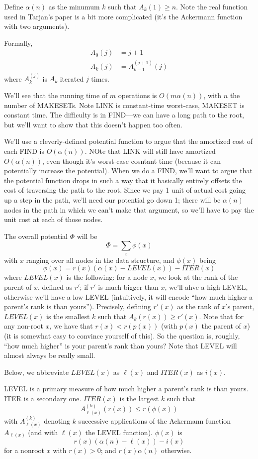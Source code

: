 \documentclass{article}
\begin{document}
Define $\alpha(n)$ as the minumum $k$ such that $A_k(1) \geq n$.
Note the real function used in Tarjan's paper is a bit more complicated (it's
the Ackermann function with two arguments).

Formally,
\begin{align}
A_0(j) &=
j + 1 \\
A_k(j) &=
A_{k-1}^{(j+1)}(j)
\end{align}
where $A_k^{(j)}$ is $A_k$ iterated $j$ times.

We'll see that the running time of $m$ operations is $O(m\alpha(n))$, with 
$n$ the number of MAKESETs.
Note LINK is constant-time worst-case, MAKESET is constant time.
The difficulty is in FIND---we can have a long path to the root, but we'll
want to show that this doesn't happen too often.

We'll use a cleverly-defined potential function to argue that the amortized
cost of each FIND is $O(\alpha(n))$.
NOte that LINK will still have amortized $O(\alpha(n))$, even though it's
worst-case cosntant time (because it can potentially increase the potential).
When we do a FIND, we'll want to argue that the potential function drops
in such a way that it basically entirely offsets the cost of traversing
the path to the root.
Since we pay 1 unit of actual cost going up a step in the path, we'll need
our potential go down 1; there will be $\alpha(n)$ nodes in the path in which
we can't make that argument, so we'll have to pay the unit cost at each of
those nodes.

The overall potential $\Phi$ will be
$$
\Phi = \sum_x \phi(x)
$$
with $x$ ranging over all nodes in the data structure, and $\phi(x)$ being
$$
\phi(x) = r(x) (\alpha(x) - LEVEL(x)) - ITER(x)
$$
where $LEVEL(x)$ is the following: for a node $x$, we look at the
rank of the parent of $x$, defined as $r'$; if $r'$ is much bigger than
$x$, we'll ahve a high LEVEL, otherwise we'll have a low LEVEL (intuitively,
it will encode ``how much higher a parent's rank is than yours'').
Precisely, defining $r'(x)$ as the rank of $x$'s parent,
$LEVEL(x)$ is the smallest $k$ such that $A_k(r(x)) \geq r'(x)$.
Note that for any non-root $x$, we have that $r(x) < r(p(x))$ (with $p(x)$ the
parent of $x$) (it is somewhat easy to convince yourself of this).
So the question is, roughly, ``how much higher'' is your parent's rank than
yours?
Note that LEVEL will almost always be really small.

Below, we abbreviate $LEVEL(x)$ as $\ell(x)$ and $ITER(x)$ as $i(x)$.

LEVEL is a primary measure of how much higher a parent's rank is than yours.
ITER is a secondary one.
$ITER(x)$ is the largest $k$ such that 
$$A_{\ell(x)}^{(k)}(r(x)) \leq r(\phi(x))$$
with $A_{\ell(x)}^{(k)}$ denoting $k$ successive applications of the
Ackermann function $A_{\ell(x)}$ (and with $\ell(x)$ the LEVEL function).
$\phi(x)$ is 
$$r(x) (\alpha(n) - \ell(x)) - i(x)$$ 
for a nonroot
$x$ with $r(x) > 0$;
and $r(x)\alpha(n)$ otherwise.
\end{document}
